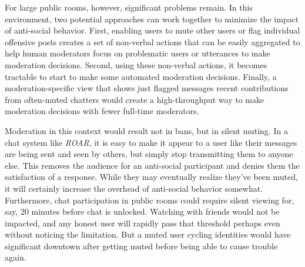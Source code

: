 For large public rooms, however, significant problems remain. In this environment, two potential approaches can work together to minimize the impact of anti-social behavior. First, enabling users to mute other users or flag individual offensive posts creates a set of non-verbal actions that can be easily aggregated to help human moderators focus on problematic users or utterances to make moderation decisions. Second, using these non-verbal actions, it becomes tractable to start to make some automated moderation decisions. Finally, a moderation-specific view that shows just flagged messages recent contributions from often-muted chatters would create a high-throughput way to make moderation decisions with fewer full-time moderators.

Moderation in this context would result not in bans, but in silent muting. In a chat system like \emph{ROAR}, it is easy to make it appear to a user like their messages are being sent and seen by others, but simply stop transmitting them to anyone else. This removes the audience for an anti-social participant and denies them the satisfaction of a response. While they may eventually realize they've been muted, it will certainly increase the overhead of anti-social behavior somewhat. Furthermore, chat participation in public rooms could require silent viewing for, say, 20 minutes before chat is unlocked. Watching with friends would not be impacted, and any honest user will rapidly pass that threshold perhaps even without noticing the limitation. But a muted user cycling identities would have significant downtown after getting muted before being able to cause trouble again.



